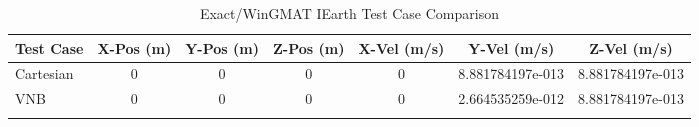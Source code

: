 \begin{table}[htbp!]
\centering
\caption{ Exact/WinGMAT IEarth Test Case Comparison}
      \begin{tabular}{lcccccc}
      \hline\hline
          Test Case & X-Pos (m) & Y-Pos (m) & Z-Pos (m) & X-Vel (m/s) & Y-Vel (m/s) & Z-Vel (m/s) \\
         \hline
         Cartesian & 0 & 0 & 0 & 0 & 8.881784197e-013 & 8.881784197e-013 \\
         VNB & 0 & 0 & 0 & 0 & 2.664535259e-012 & 8.881784197e-013 \\
      \hline\hline
      \label{Table: IEarth Exact-WinGMAT Table} 
\end{tabular}
\end{table}

